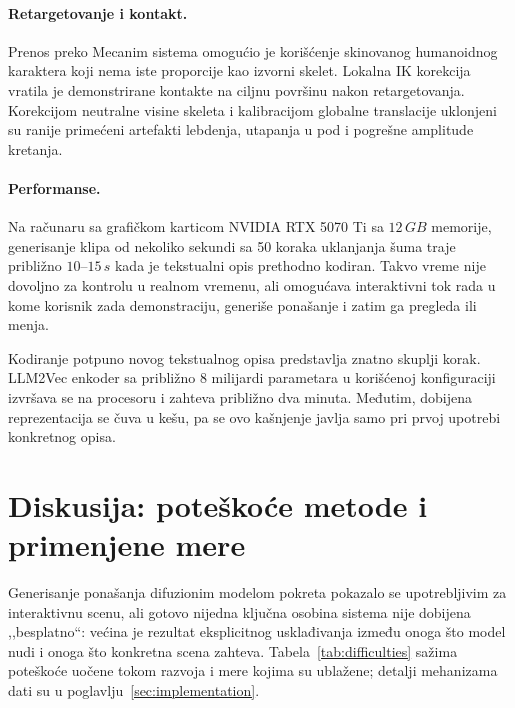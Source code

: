 \documentclass{article}
\begin{document}
\paragraph{Retargetovanje i kontakt.}
Prenos preko Mecanim sistema omogućio je korišćenje skinovanog humanoidnog karaktera koji nema iste proporcije kao izvorni skelet. Lokalna IK korekcija vratila je demonstrirane kontakte na ciljnu površinu nakon retargetovanja. Korekcijom neutralne visine skeleta i kalibracijom globalne translacije uklonjeni su ranije primećeni artefakti lebdenja, utapanja u pod i pogrešne amplitude kretanja.

\paragraph{Performanse.}
Na računaru sa grafičkom karticom NVIDIA RTX 5070 Ti sa $12\,GB$ memorije, generisanje klipa od nekoliko sekundi sa 50 koraka uklanjanja šuma traje približno $10$--$15\,s$ kada je tekstualni opis prethodno kodiran. Takvo vreme nije dovoljno za kontrolu u realnom vremenu, ali omogućava interaktivni tok rada u kome korisnik zada demonstraciju, generiše ponašanje i zatim ga pregleda ili menja.

Kodiranje potpuno novog tekstualnog opisa predstavlja znatno skuplji korak. LLM2Vec enkoder sa približno 8 milijardi parametara u korišćenoj konfiguraciji izvršava se na procesoru i zahteva približno dva minuta. Međutim, dobijena reprezentacija se čuva u kešu, pa se ovo kašnjenje javlja samo pri prvoj upotrebi konkretnog opisa.


\section{Diskusija: poteškoće metode i primenjene mere}
\label{sec:discussion}

Generisanje ponašanja difuzionim modelom pokreta pokazalo se upotrebljivim za interaktivnu scenu, ali gotovo nijedna ključna osobina sistema nije dobijena ,,besplatno``: većina je rezultat eksplicitnog usklađivanja između onoga što model nudi i onoga što konkretna scena zahteva. Tabela~\ref{tab:difficulties} sažima poteškoće uočene tokom razvoja i mere kojima su ublažene; detalji mehanizama dati su u poglavlju~\ref{sec:implementation}.
\end{document}
